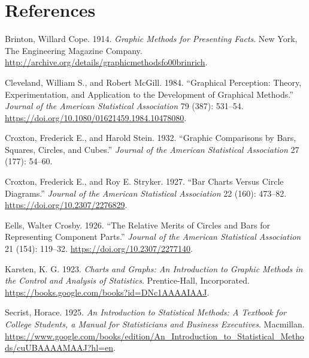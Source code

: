 \documentclass[
  10pt,
  letterpaper,
  twocolumn]{article}
\newlength{\cslhangindent}
\newenvironment{CSLReferences}[2] %
 {\begin{list}{}{%
  \setlength{\itemindent}{0pt}
  \setlength{\leftmargin}{0pt}
  \setlength{\parsep}{0pt}
  \ifodd #1
   \setlength{\leftmargin}{\cslhangindent}
   \setlength{\itemindent}{-1\cslhangindent}
  \fi
  \setlength{\itemsep}{#2\baselineskip}}}
 {\end{list}}
\begin{document}
\section*{References}\label{references}

\label{refs}
\begin{CSLReferences}{1}{0}
Brinton, Willard Cope. 1914. \emph{Graphic Methods for Presenting
Facts}. New York, The Engineering Magazine Company.
\url{http://archive.org/details/graphicmethodsfo00brinrich}.

Cleveland, William S., and Robert McGill. 1984. {``Graphical Perception:
Theory, Experimentation, and Application to the Development of Graphical
Methods.''} \emph{Journal of the American Statistical Association} 79
(387): 531--54. \url{https://doi.org/10.1080/01621459.1984.10478080}.

Croxton, Frederick E., and Harold Stein. 1932. {``Graphic Comparisons by
Bars, Squares, Circles, and Cubes.''} \emph{Journal of the American
Statistical Association} 27 (177): 54--60.

Croxton, Frederick E., and Roy E. Stryker. 1927. {``Bar Charts Versus
Circle Diagrams.''} \emph{Journal of the American Statistical
Association} 22 (160): 473--82. \url{https://doi.org/10.2307/2276829}.

Eells, Walter Crosby. 1926. {``The Relative Merits of Circles and Bars
for Representing Component Parts.''} \emph{Journal of the American
Statistical Association} 21 (154): 119--32.
\url{https://doi.org/10.2307/2277140}.

Karsten, K. G. 1923. \emph{Charts and {Graphs}: {An Introduction} to
{Graphic Methods} in the {Control} and {Analysis} of {Statistics}}.
Prentice-Hall, Incorporated.
\url{https://books.google.com/books?id=DNc1AAAAIAAJ}.

Secrist, Horace. 1925. \emph{An {Introduction} to {Statistical Methods}:
{A Textbook} for {College Students}, a {Manual} for {Statisticians} and
{Business Executives}}. Macmillan.
\url{https://www.google.com/books/edition/An_Introduction_to_Statistical_Methods/cuUBAAAAMAAJ?hl=en}.


\end{CSLReferences}
\end{document}
